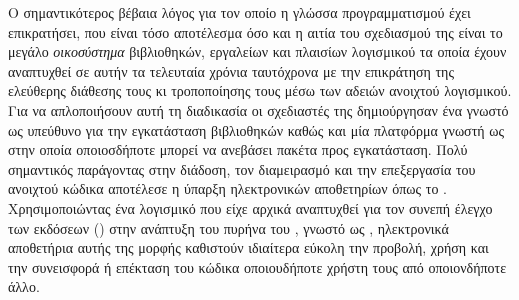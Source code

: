 Ο σημαντικότερος βέβαια λόγος για τον οποίο η γλώσσα προγραμματισμού  έχει επικρατήσει, που είναι τόσο αποτέλεσμα όσο και η αιτία του σχεδιασμού της είναι το μεγάλο \textit{οικοσύστημα} βιβλιοθηκών, εργαλείων και πλαισίων λογισμικού τα οποία έχουν αναπτυχθεί σε αυτήν τα τελευταία χρόνια ταυτόχρονα με την επικράτηση της ελεύθερης διάθεσης τους κι τροποποίησης τους μέσω των αδειών ανοιχτού λογισμικού.
Για να απλοποιήσουν αυτή τη διαδικασία οι σχεδιαστές της  δημιούργησαν ένα  γνωστό ως  υπεύθυνο για την εγκατάσταση βιβλιοθηκών καθώς και μία πλατφόρμα γνωστή ως  στην οποία οποιοσδήποτε μπορεί να ανεβάσει πακέτα προς εγκατάσταση.
Πολύ σημαντικός παράγοντας στην διάδοση, τον διαμειρασμό και την επεξεργασία του ανοιχτού κώδικα αποτέλεσε η ύπαρξη ηλεκτρονικών αποθετηρίων όπως το .
Χρησιμοποιώντας ένα λογισμικό που είχε αρχικά αναπτυχθεί για τον συνεπή έλεγχο των εκδόσεων () στην ανάπτυξη του πυρήνα του , γνωστό ως , ηλεκτρονικά αποθετήρια αυτής της μορφής καθιστούν ιδιαίτερα εύκολη την προβολή, χρήση και την συνεισφορά ή επέκταση του κώδικα οποιουδήποτε χρήστη τους από οποιονδήποτε άλλο.
